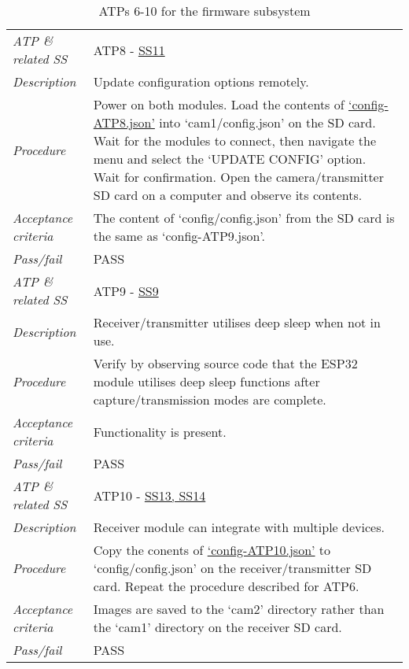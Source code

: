 \documentclass[class=report,11pt,crop=false]{standalone}
\begin{document}
\begin{table}[!ht]
\begin{scriptsize}
\begin{tabularx}{\textwidth}{|p{} X|}
        \textit{ATP \& related SS} & ATP8 - \hyperlink{tab:firmware-requirements}{SS11}\\
        \textit{Description} & Update configuration options remotely.\\
        \textit{Procedure} & Power on both modules. Load the contents of \href{https://github.com/rothdu/EEE4113F-Group13-2024/blob/main/firmware/json-samples/config-ATP8.json}{`config-ATP8.json'} into `cam1/config.json' on the SD card. Wait for the modules to connect, then navigate the menu and select the `UPDATE CONFIG' option. Wait for confirmation. Open the camera/transmitter SD card on a computer and observe its contents.\\
        \textit{Acceptance criteria} & The content of `config/config.json' from the SD card is the same as `config-ATP9.json'.\\ 
        \textit{Pass/fail} & PASS \\ \hline

        \textit{ATP \& related SS} & ATP9 - \hyperlink{tab:firmware-requirements}{SS9}\\
        \textit{Description} & Receiver/transmitter utilises deep sleep when not in use.\\
        \textit{Procedure} & Verify by observing source code that the ESP32 module utilises deep sleep functions after capture/transmission modes are complete. \\
        \textit{Acceptance criteria} & Functionality is present.\\ 
        \textit{Pass/fail} & PASS\\ \hline

        \textit{ATP \& related SS} & ATP10 - \hyperlink{tab:firmware-requirements}{SS13, SS14}\\
        \textit{Description} & Receiver module can integrate with multiple devices.\\
        \textit{Procedure} & Copy the conents of \href{https://github.com/rothdu/EEE4113F-Group13-2024/blob/main/firmware/json-samples/config-ATP10.json}{`config-ATP10.json'} to `config/config.json' on the receiver/transmitter SD card. Repeat the procedure described for ATP6. \\
        \textit{Acceptance criteria} & Images are saved to the `cam2' directory rather than the `cam1' directory on the receiver SD card.\\ 
        \textit{Pass/fail} & PASS\\ \hline

    \end{tabularx}
    \end{scriptsize}
    \caption{ATPs 6-10 for the firmware subsystem}
    \label{tab:firmware-atps2}
\end{table}
\end{document}
